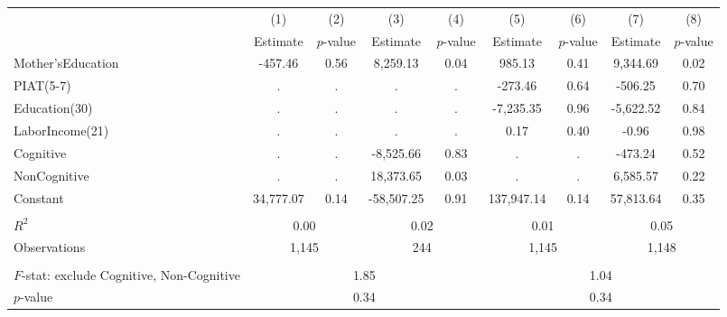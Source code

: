 \begin{tabular}{lcccccccc} \toprule
 & (1) & (2) & (3) & (4) & (5) & (6) & (7) & (8) \\
 & Estimate & $p$-value & Estimate & $p$-value  & Estimate & $p$-value  & Estimate & $p$-value  \\ \midrule 
Mother'sEducation &      -457.46 &         0.56 &     8,259.13 &         0.04 &       985.13 &         0.41 &     9,344.69 &         0.02 \\  
PIAT(5-7) &            . &            . &            . &            . &      -273.46 &         0.64 &      -506.25 &         0.70 \\  
Education(30) &            . &            . &            . &            . &    -7,235.35 &         0.96 &    -5,622.52 &         0.84 \\  
LaborIncome(21) &            . &            . &            . &            . &         0.17 &         0.40 &        -0.96 &         0.98 \\  
Cognitive &            . &            . &    -8,525.66 &         0.83 &            . &            . &      -473.24 &         0.52 \\  
NonCognitive &            . &            . &    18,373.65 &         0.03 &            . &            . &     6,585.57 &         0.22 \\  
Constant &    34,777.07 &         0.14 &   -58,507.25 &         0.91 &   137,947.14 &         0.14 &    57,813.64 &         0.35 \\  \\ \midrule
$R^2$ &         \multicolumn{2}{c}{0.00} &               \multicolumn{2}{c}{0.02} &                \multicolumn{2}{c}{0.01} &             \multicolumn{2}{c}{0.05}   \\  
Observations &       \multicolumn{2}{c}{1,145} &              \multicolumn{2}{c}{244}  &       \multicolumn{2}{c}{1,145} &      \multicolumn{2}{c}{1,148}   \\  \\ \midrule
$F$-stat: exclude Cognitive, Non-Cognitive &                \multicolumn{4}{c}{1.85} &                 \multicolumn{4}{c}{1.04}   \\  
$p$-value  &                \multicolumn{4}{c}{0.34} &                \multicolumn{4}{c}{0.34}    \\  \bottomrule \end{tabular}

